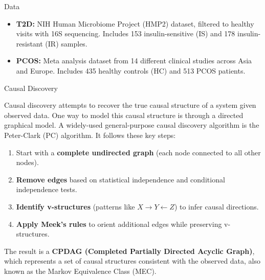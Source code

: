 \documentclass[final]{beamer}
\newlength{\colwidth}
\begin{document}
\begin{frame}[t]
\begin{columns}[t]
\begin{column}{\colwidth}
  \vspace{0.5cm}

  \begin{block}{Data}

    
    \begin{itemize}
      \item \textbf{T2D:} NIH Human Microbiome Project (HMP2) dataset, filtered to healthy visits with 16S sequencing. Includes 153 insulin-sensitive (IS) and 178 insulin-resistant (IR) samples.
      \item \textbf{PCOS:} Meta analysis dataset from 14 different clinical studies across Asia and Europe. Includes 435 healthy controls (HC) and 513 PCOS patients.
    \end{itemize}

  \end{block}
  
  \vspace{0.5cm}
  
	  \begin{alertblock}{Causal Discovery}
	  
	  	Causal discovery attempts to recover the true causal structure of a system given observed data. One way to model this causal structure is through a directed graphical model. A widely-used general-purpose causal discovery algorithm is the Peter-Clark (PC) algorithm. It follows these key steps:
		\begin{enumerate}
		    \item Start with a \textbf{complete undirected graph} (each node connected to all other nodes).
		    \item \textbf{Remove edges} based on statistical independence and conditional independence tests.
		    \item \textbf{Identify v-structures} (patterns like $X \to Y \leftarrow Z$) to infer causal directions.
		    \item \textbf{Apply Meek’s rules} to orient additional edges while preserving v-structures.
		\end{enumerate}

	The result is a \textbf{CPDAG (Completed Partially Directed Acyclic Graph)}, which represents a set of causal structures consistent with the observed data, also known as the Markov Equivalence Class (MEC). 

	  

\end{alertblock}
\end{column}
\end{columns}
\end{frame}
\end{document}
